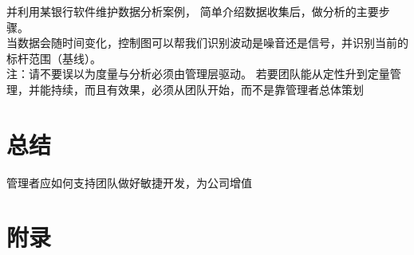 \documentclass{book}        %
\begin{document}
并利用某银行软件维护数据分析案例， 简单介绍数据收集后，做分析的主要步骤。\\

当数据会随时间变化，控制图可以帮我们识别波动是噪音还是信号，并识别当前的标杆范围（基线）。\\

注：请不要误以为度量与分析必须由管理层驱动。 若要团队能从定性升到定量管理，并能持续，而且有效果，必须从团队开始，而不是靠管理者总体策划 \\










\part{总结} 管理者应如何支持团队做好敏捷开发，为公司增值\\





\part{附录}




\end{document}
